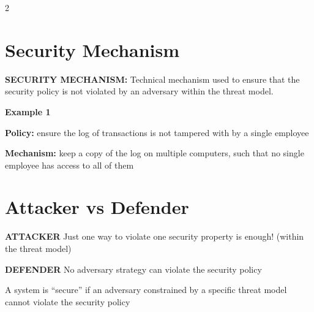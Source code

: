 \documentclass[a4paper,9pt]{extarticle}
\begin{document}
\begin{multicols}{2}
\begin{example}
\end{example}



\section{Security Mechanism}


\begin{definition}

\textbf{SECURITY MECHANISM:} Technical mechanism used to ensure that the security policy
is not violated by an adversary within the threat model.

\end{definition}


\begin{example}

\textbf{Example 1}

\textbf{Policy:} ensure the log of transactions is not tampered with by a single employee

\textbf{Mechanism:} keep a copy of the log on multiple computers, such that no single employee has access to all of them

\end{example}



\section{Attacker vs Defender}


\begin{definition}

\textbf{ATTACKER} Just one way to violate one security property is enough!
(within the threat model)

\end{definition}


\begin{definition}

\textbf{DEFENDER} No adversary strategy can violate the security policy

\end{definition}


\begin{important}

A system is ``secure'' if an adversary constrained by a
specific threat model cannot violate the security policy

\end{important}



\end{multicols}
\end{document}
